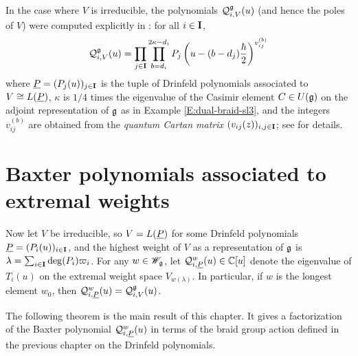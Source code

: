 In the case where $V$ is irreducible, the polynomials $\mathcal{Q}_{i,V}^{\mathfrak{g}}(u)$ (and hence the poles of $V$) were computed explicitly in \cite[Thm. 5.2]{gautam_poles_2023}: for all $i\in\mathbf{I}$,
\[\mathcal{Q}_{i,V}^{\mathfrak{g}}(u) = \prod_{j\in\mathbf{I}}\prod_{b=d_i}^{2\kappa-d_i} P_j\left(u-(b-d_j)\frac{\hbar}{2}\right)^{v_{ij}^{(b)}}\]
where $\underline{P}=(P_j(u))_{j\in\mathbf{I}}$ is the tuple of Drinfeld polynomials associated to $V\cong L(\underline{P})$, $\kappa$ is $1/4$ times the eigenvalue of the Casimir element $C\in U(\mathfrak{g})$ on the adjoint representation of $\mathfrak{g}$ as in Example \ref{E:dual-braid-sl3}, and the integers $v_{ij}^{(b)}$ are obtained from the \emph{quantum Cartan matrix} $(v_{ij}(z))_{i,j\in\mathbf{I}}$; see \cite[\S 5.2]{friesen_braid_2024} for details.


\section{Baxter polynomials associated to extremal weights}

Now let $V$ be irreducible, so $V=L(\underline{P})$ for some Drinfeld polynomials $\underline{P}=(P_i(u))_{i\in\mathbf{I}}$, and the highest weight of $V$ as a representation of $\mathfrak{g}$ is $\lambda = \sum_{i\in\mathbf{I}}\deg(P_i)\varpi_i$.
For any $w\in\mathscr{W}_{\mathfrak{g}}$, let $\mathcal{Q}_{i,\underline{P}}^w(u)\in\mathbb{C}[u]$ denote the eigenvalue of $T_i(u)$ on the extremal weight space $V_{w(\lambda)}$.
In particular, if $w$ is the longest element $w_0$, then $\mathcal{Q}_{i,\underline{P}}^w(u) = \mathcal{Q}_{i,V}^{\mathfrak{g}}(u)$.

The following theorem is the main result of this chapter.
It gives a factorization of the Baxter polynomial $\mathcal{Q}_{i,\underline{P}}^w(u)$ in terms of the braid group action defined in the previous chapter on the Drinfeld polynomials.

